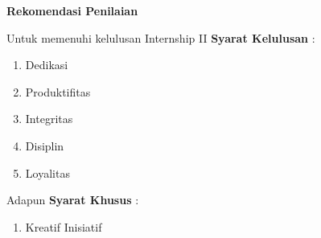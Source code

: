 \begin{center}
  \textbf{Rekomendasi Penilaian}
\end{center}
Untuk memenuhi kelulusan Internship II \textbf{Syarat Kelulusan} :
\begin{enumerate}
  \item Dedikasi
  \item Produktifitas
  \item Integritas
  \item Disiplin
  \item Loyalitas
\end{enumerate}
Adapun \textbf{Syarat Khusus} :
\begin{enumerate}
  \item Kreatif Inisiatif
\end{enumerate}

